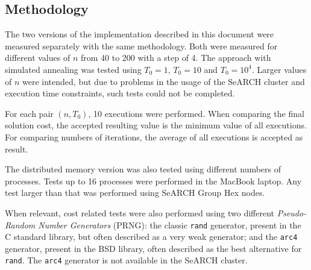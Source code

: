 \subsection{Methodology}
\label{sec:methodology}

The two versions of the implementation described in this document were measured separately with the same methodology. Both were measured for different values of $n$ from 40 to 200 with a step of 4. The approach with simulated annealing was tested using $T_{0}=1$, $T_{0}=10$ and $T_{0}=10^{4}$. Larger values of $n$ were intended, but due to problems in the usage of the SeARCH cluster and execution time constraints, such tests could not be completed.

For each pair $(n,T_{0})$, 10 executions were performed. When comparing the final solution cost, the accepted resulting value is the minimum value of all executions. For comparing numbers of iterations, the average of all executions is accepted as result.

The distributed memory version was also tested using different numbers of processes. Tests up to 16 processes were performed in the MacBook laptop. Any test larger than that was performed using SeARCH Group Hex nodes.

When relevant, cost related tests were also performed using two different \textit{Pseudo-Random Number Generators} (PRNG): the classic \texttt{rand} generator, present in the C standard library, but often described as a very weak generator; and the \texttt{arc4} generator, present in the BSD library, often described as the best alternative for \texttt{rand}. The \texttt{arc4} generator is not available in the SeARCH cluster.
